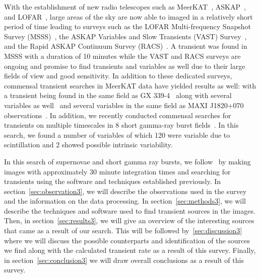 \documentclass[12pt]{article}
\begin{document}
With the establishment of new radio telescopes such as MeerKAT~\citep{2009IEEEP..97.1522J}, ASKAP~\citep{2008ExA....22..151J}, and LOFAR~\citep{2013A&A...556A...2V}, large areas of the sky are now able to imaged in a relatively short period of time leading to surveys such as the LOFAR Multi-frequency Snapshot Survey (MSSS)~\citep{2016MNRAS.456.2321S}, the ASKAP Variables and Slow Transients (VAST) Survey~\citep{2021PASA...38...54M}, and the Rapid ASKAP Continuum Survey (RACS)~\citep{2020PASA...37...48M}. A transient was found in MSSS with a duration of 10 minutes while the VAST and RACS surveys are ongoing and promise to find transients and variables as well due to their large fields of view and good sensitivity. In addition to these dedicated surveys, commensal transient searches in MeerKAT data have yielded results as well: with a transient being found in the same field as GX 339-4~\citep{2020MNRAS.491..560D} along with several variables as well~\citep{2022MNRAS.512.5037D} and several variables in the same field as MAXI J1820+070 observations~\citep{2022MNRAS.517.2894R}. In addition, we recently conducted commensal searches for transients on multiple timescales in 8 short gamma-ray burst fields~\citep{commensal1}. In this search, we found a number of variables of which 120 were variable due to scintillation and 2 showed possible intrinsic variability. 

In this search of supernovae and short gamma ray bursts, we follow~\citet{commensal1} by making images with approximately 30 minute integration times and searching for transients using the software and techniques established previously. In section~\ref{sec:observation3}, we will describe the observations used in the survey and the information on the data processing. In section~\ref{sec:methods3}, we will describe the techniques and software used to find transient sources in the images. Then, in section~\ref{sec:results3}, we will give an overview of the interesting sources that came as a result of our search. This will be followed by~\ref{sec:discussion3} where we will discuss the possible counterparts and identification of the sources we find along with the calculated transient rate as a result of this survey. Finally, in section~\ref{sec:conclusion3} we will draw overall conclusions as a result of this survey.
\end{document}
